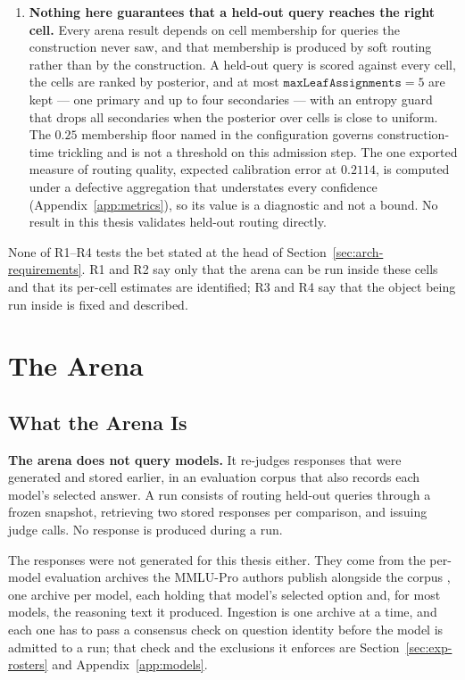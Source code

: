 \begin{enumerate}
\item \textbf{Nothing here guarantees that a held-out query reaches the
right cell.} Every arena result depends on cell membership for queries
the construction never saw, and that membership is produced by soft
routing rather than by the construction. A held-out query is scored
against every cell, the cells are ranked by posterior, and at most
$\texttt{maxLeafAssignments} = 5$ are kept --- one primary and up to
four secondaries --- with an entropy guard that drops all secondaries
when the posterior over cells is close to uniform. The $0.25$
membership floor named in the configuration governs construction-time
trickling and is not a threshold on this admission step. The one
exported measure of routing quality, expected calibration error at
$0.2114$, is computed under a defective aggregation that understates
every confidence (Appendix~\ref{app:metrics}), so its value is a
diagnostic and not a bound. No result in this thesis validates held-out
routing directly.
\end{enumerate}

None of R1--R4 tests the bet stated at the head of
Section~\ref{sec:arch-requirements}. R1 and R2 say only that the arena
can be run inside these cells and that its per-cell estimates are
identified; R3 and R4 say that the object being run inside is fixed and
described.



\section{The Arena}\label{sec:arch-arena}

\subsection{What the Arena Is}\label{sec:arch-overview}

\textbf{The arena does not query models.} It re-judges responses that
were generated and stored earlier, in an evaluation corpus that also
records each model's selected answer. A run consists of routing
held-out queries through a frozen snapshot, retrieving two stored
responses per comparison, and issuing judge calls. No response is
produced during a run.

The responses were not generated for this thesis either. They come from
the per-model evaluation archives the MMLU-Pro authors publish
alongside the corpus \parencite{wang2024mmlupro}, one archive per
model, each holding that model's selected option and, for most models,
the reasoning text it produced. Ingestion is one archive at a time, and
each one has to pass a consensus check on question identity before the
model is admitted to a run; that check and the exclusions it enforces
are Section~\ref{sec:exp-rosters} and Appendix~\ref{app:models}.

